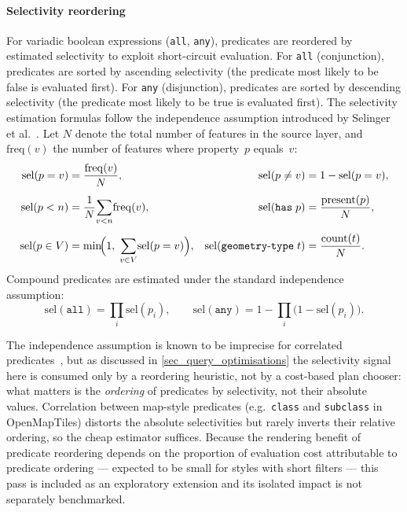 \paragraph{Selectivity reordering}
For variadic boolean expressions (\texttt{all}, \texttt{any}), predicates are reordered by estimated selectivity to exploit short-circuit evaluation.
For \texttt{all} (conjunction), predicates are sorted by ascending selectivity (the predicate most likely to be false is evaluated first).
For \texttt{any} (disjunction), predicates are sorted by descending selectivity (the predicate most likely to be true is evaluated first).
The selectivity estimation formulas follow the independence assumption introduced by Selinger et al.~\cite{selingerAccessPathSelection1979}.
Let $N$ denote the total number of features in the source layer, and $\mathrm{freq}(v)$ the number of features where property~$p$ equals~$v$:
\begin{equation}\label{eq:selectivity}
    \begin{aligned}
        \mathrm{sel}(p = v)   &= \frac{\mathrm{freq}(v)}{N},  &
        \mathrm{sel}(p \neq v) &= 1 - \mathrm{sel}(p = v), \\[4pt]
        \mathrm{sel}(p < n)   &= \frac{1}{N}\!\sum_{v < n}\! \mathrm{freq}(v),  &
        \mathrm{sel}(\mathtt{has}\; p) &= \frac{\mathrm{present}(p)}{N}, \\[4pt]
        \mathrm{sel}(p \in V)  &= \min\!\Bigl(1,\;\sum_{v \in V}\! \mathrm{sel}(p = v)\Bigr), &
        \mathrm{sel}(\mathtt{geometry\text{-}type}\; t) &= \frac{\mathrm{count}(t)}{N}.
    \end{aligned}
\end{equation}
Compound predicates are estimated under the standard independence assumption:
\begin{equation}\label{eq:selectivity_compound}
    \mathrm{sel}(\texttt{all}) = \prod_i \mathrm{sel}(p_i), \qquad
    \mathrm{sel}(\texttt{any}) = 1 - \prod_i \bigl(1 - \mathrm{sel}(p_i)\bigr).
\end{equation}

\noindent The independence assumption is known to be imprecise for correlated predicates~\cite{selingerAccessPathSelection1979}, but as discussed in \cref{sec_query_optimisations} the selectivity signal here is consumed only by a reordering heuristic, not by a cost-based plan chooser: what matters is the \emph{ordering} of predicates by selectivity, not their absolute values.
Correlation between map-style predicates (e.g.\ \texttt{class} and \texttt{subclass} in OpenMapTiles) distorts the absolute selectivities but rarely inverts their relative ordering, so the cheap estimator suffices.
Because the rendering benefit of predicate reordering depends on the proportion of evaluation cost attributable to predicate ordering --- expected to be small for styles with short filters --- this pass is included as an exploratory extension and its isolated impact is not separately benchmarked.

